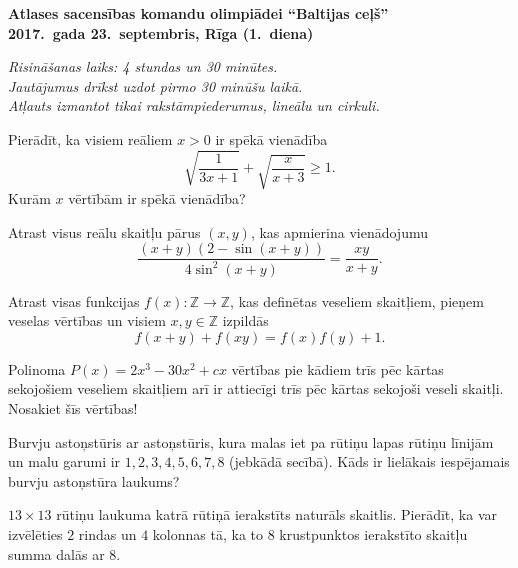 \documentclass[11pt]{article}
\begin{document}
\begin{center}
{\Large \bf Atlases sacensības komandu olimpiādei ``Baltijas ceļš''}\\
{\bf 2017.\ gada 23.\ septembris, Rīga (1.\ diena)}
\end{center}

{\footnotesize \em 
Risināšanas laiks: 4 stundas un 30 minūtes.\\
Jautājumus drīkst uzdot pirmo 30 minūšu laikā.\\ 
Atļauts izmantot tikai rakstāmpiederumus, lineālu un cirkuli.
}

\begin{problem}[BwTst2017.1]
Pierādīt, ka visiem reāliem $x>0$ ir spēkā vienādība
\[ \sqrt{\frac{1}{3x+1}} + \sqrt{\frac{x}{x+3}} \geq 1. \]
Kurām $x$ vērtībām ir spēkā vienādība?
\end{problem}

\begin{problem}[BwTst2017.2]
Atrast visus reālu skaitļu pārus $(x,y)$, kas apmierina vienādojumu
\[ \frac{(x+y)(2 - \sin(x+y))}{4 \sin^2(x+y)} = \frac{xy}{x+y}. \]
\end{problem}

\begin{problem}[BwTst2017.3]
Atrast visas funkcijas $f(x): \mathbb{Z} \rightarrow \mathbb{Z}$, kas
definētas veseliem skaitļiem, pieņem veselas vērtības un visiem 
$x,y \in \mathbb{Z}$ izpildās
\[ f(x+y) + f(xy) = f(x)f(y) + 1. \]
\end{problem}

\begin{problem}[BwTst2017.4]
Polinoma $P(x) = 2x^3 - 30x^2 + cx$ vērtības pie kādiem trīs pēc kārtas 
sekojošiem veseliem skaitļiem arī ir attiecīgi trīs pēc kārtas sekojoši veseli skaitļi. 
Nosakiet šīs vērtības!
\end{problem}


\begin{problem}[BwTst2017.5]
Burvju astoņstūris ar astoņstūris, kura malas iet pa rūtiņu lapas rūtiņu 
līnijām un malu garumi ir $1,2,3,4,5,6,7,8$ (jebkādā secībā). 
Kāds ir lielākais iespējamais burvju astoņstūra laukums?
\end{problem}

\begin{problem}[BwTst2017.6]
$13 \times 13$ rūtiņu laukuma katrā rūtiņā ierakstīts naturāls skaitlis. 
Pierādīt, ka var izvēlēties $2$ rindas un $4$ kolonnas tā, ka to $8$ krustpunktos 
ierakstīto skaitļu summa dalās ar $8$.  
\end{problem}
\end{document}

